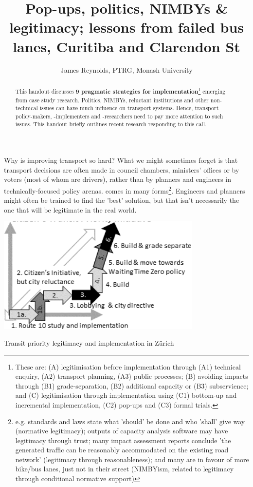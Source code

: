 \documentclass[nobib]{tufte-handout}
\title{Pop-ups, politics,  NIMBYs \& legitimacy; lessons from failed bus lanes, Curitiba and Clarendon St}
\author{James Reynolds, PTRG, Monash University}
\begin{document}
\maketitle%

\begin{abstract}
\noindent
This handout discusses \textbf{9 pragmatic strategies for implementation}\footnote{These are: (A) legitimisation before implementation through (A1) technical enquiry, (A2) transport planning, (A3) public processes; (B) avoiding impacts through (B1) grade-separation, (B2) additional capacity or (B3) subservience; and (C) legitimisation through implementation using (C1) bottom-up and incremental implementation, (C2) pop-ups and (C3) formal trials.} emerging from case study research. Politics, NIMBYs, reluctant institutions and other non-technical issues can have much influence on transport systems. Hence, transport policy-makers, -implementers and -researchers need to pay more attention to such issues\citep{Marsden:2017aa}. This handout briefly outlines recent research\citep{Reynolds:2020aa} responding to this call.  
\end{abstract}


Why is improving transport so hard? What we might sometimes forget is that transport decisions are often made in council chambers, ministers' offices or by voters (most of whom are drivers), rather than by planners and engineers in technically-focused policy arenas.   comes in many forms\footnote{e.g. standards and laws state what 'should' be done and who 'shall' give way (normative legitimacy);  outputs of capacity analysis software may have legitimacy through trust; many impact assessment reports conclude 'the generated traffic can be reasonably accommodated on the existing road network' (legitimacy through reasonableness); and many are in favour of more bike/bus lanes, just not in their street (NIMBYism, related to legitimacy through conditional normative support)}. Engineers and planners might often be trained to find the 'best' solution, but that isn't necessarily the one that will be legitimate in the real world.   



\begin{marginfigure}%
  \includegraphics[width=\linewidth]{Zurich}
  \caption{Transit priority legitimacy and implementation in Zürich}
  \label{fig:Zurich}
\end{marginfigure}
\end{document}
